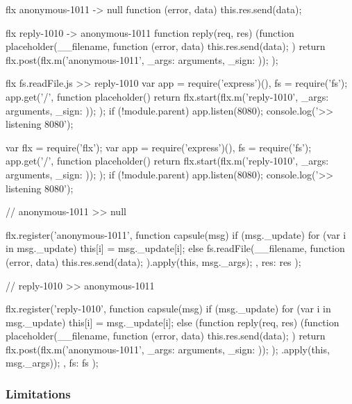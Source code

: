 \begin{code}[Javascript, caption={Fluxionnal compilation result of the example},label={lst:exflx}]
flx anonymous-1011
-> null
  function (error, data) {
    this.res.send(data);
  }

flx reply-1010
-> anonymous-1011
  function reply(req, res) {
    (function placeholder(__filename, function (error, data) {
      this.res.send(data);
    }) {
      return flx.post(flx.m('anonymous-1011', {
        _args: arguments,
        _sign: {}
      }));
    });
  }

flx fs.readFile.js
>> reply-1010
  var app = require('express')(), fs = require('fs');
  app.get('/', function placeholder() {
    return flx.start(flx.m('reply-1010', {
      _args: arguments,
      _sign: {}
    }));
  });
  if (!module.parent) {
    app.listen(8080);
    console.log('>> listening 8080');
  }
\end{code}

\begin{code}[Javascript, caption={Execution model compliant compilation result of the example},label={lst:exmiddle}]
var flx = require('flx');
var app = require('express')(), fs = require('fs');
app.get('/', function placeholder() {
  return flx.start(flx.m('reply-1010', {
    _args: arguments,
    _sign: {}
  }));
});
if (!module.parent) {
  app.listen(8080);
  console.log('>> listening 8080');
}

// anonymous-1011 >> null

flx.register('anonymous-1011', function capsule(msg) {
  if (msg._update) {
    for (var i in msg._update) {
      this[i] = msg._update[i];
    }
  } else {
    fs.readFile(__filename, function (error, data) {
      this.res.send(data);
    }).apply(this, msg._args);
  }
}, { res: res });

// reply-1010 >> anonymous-1011

flx.register('reply-1010', function capsule(msg) {
  if (msg._update) {
    for (var i in msg._update) {
      this[i] = msg._update[i];
    }
  } else {
    (function reply(req, res) {
      (function placeholder(__filename, function (error, data) {
        this.res.send(data);
      }) {
        return flx.post(flx.m('anonymous-1011', {
          _args: arguments,
          _sign: {}
        }));
      });
    }.apply(this, msg._args));
  }
}, { fs: fs });
\end{code}

\subsubsection{Limitations}

